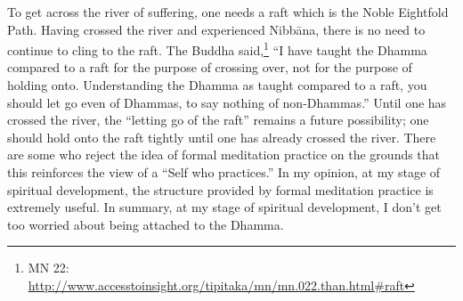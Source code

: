 To get across the river of suffering, one needs a raft which is the Noble Eightfold Path. Having crossed the river and experienced Nibbāna, there is no need to continue to cling to the raft. The Buddha said,\footnote{MN 22: \url{http://www.accesstoinsight.org/tipitaka/mn/mn.022.than.html\#raft}} “I have taught the Dhamma compared to a raft for the purpose of crossing over, not for the purpose of holding onto. Understanding the Dhamma as taught compared to a raft, you should let go even of Dhammas, to say nothing of non-Dhammas.” Until one has crossed the river, the “letting go of the raft” remains a future possibility; one should hold onto the raft tightly until one has already crossed the river. There are some who reject the idea of formal meditation practice on the grounds that this reinforces the view of a “Self who practices.” In my opinion, at my stage of spiritual development, the structure provided by formal meditation practice is extremely useful. In summary, at my stage of spiritual development, I don’t get too worried about being attached to the Dhamma.